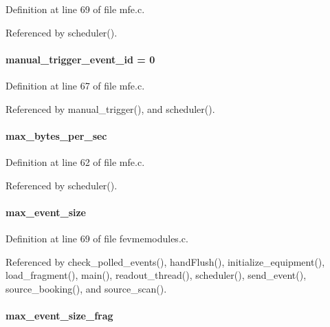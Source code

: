 Definition at line 69 of file mfe.c.

Referenced by scheduler().
\paragraph[{manual\_\-trigger\_\-event\_\-id}]{ {\bf manual\_\-trigger\_\-event\_\-id} = 0}\hfill\label{mfe_8c_a8af66bd2f0727f85b7ba0b1670d90427}


Definition at line 67 of file mfe.c.

Referenced by manual\_\-trigger(), and scheduler().
\paragraph[{max\_\-bytes\_\-per\_\-sec}]{ {\bf max\_\-bytes\_\-per\_\-sec}}\hfill\label{mfe_8c_a2b17ba35afd9a2623d17e3d3847cd293}


Definition at line 62 of file mfe.c.

Referenced by scheduler().
\paragraph[{max\_\-event\_\-size}]{ {\bf max\_\-event\_\-size}}\hfill\label{mfe_8c_a13adb6e6b95ca2a62bbfe2453d71a1cd}


Definition at line 69 of file fevmemodules.c.

Referenced by check\_\-polled\_\-events(), handFlush(), initialize\_\-equipment(), load\_\-fragment(), main(), readout\_\-thread(), scheduler(), send\_\-event(), source\_\-booking(), and source\_\-scan().
\paragraph[{max\_\-event\_\-size\_\-frag}]{ {\bf max\_\-event\_\-size\_\-frag}}\hfill\label{mfe_8c_a5593758d19398ebc7c3d58d7f05ec160}


